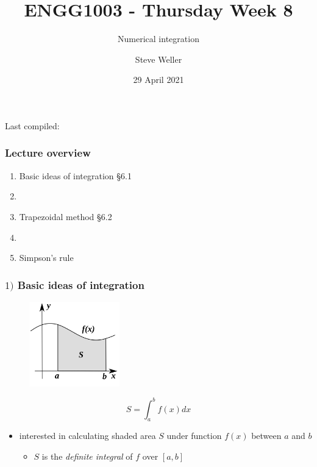 \documentclass[english,14pt]{beamer}
\title{ENGG1003 - Thursday Week 8}
\subtitle{Numerical integration }%
\author{Steve Weller}
\institute{University of Newcastle}
\date{29 April 2021}
\newcommand\red[1]{{\color{red} #1}}
\begin{document}
\begin{flushleft}
{\scriptsize Last compiled:~\DTMnow}
\vspace*{-5mm}
\end{flushleft}
\framebreak


\begin{frame}[fragile]

\frametitle{Lecture overview}
\begin{enumerate}
	\item Basic ideas of integration \red{\S6.1}
	
	\item[]
	
	\item Trapezoidal method \red{\S6.2}
	
%	
	
	\item[]
	
	\item Simpson's rule
	
\end{enumerate}

\end{frame}


\begin{frame}[fragile]

\frametitle{$1)$ Basic ideas of integration}

\vspace*{-5mm}
\begin{figure}[ht]
	\centering
	\includegraphics[width=0.35\textwidth]{figures/integralArea}
\end{figure}
\vspace*{-3mm}
\[
\boxed{S = \int_a^b f(x) dx}
\]

\vspace*{-3mm}
\begin{itemize}
	\item interested in calculating shaded area $S$ under function $f(x)$ between $a$ and $b$
	\begin{itemize}
		\item $S$ is the \emph{definite integral} of $f$ over $[a,b]$
	\end{itemize}
\end{itemize}

\end{frame}
\end{document}
